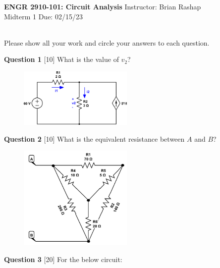 \documentclass[12pt]{article}
\begin{document}
\begin{center}
\hfil
{\large\bf {ENGR 2910-101: Circuit Analysis}}
\hfill Instructor: Brian Rashap\\
Midterm 1  \hfill Due: 02/15/23\\
\hrulefill\\
\end{center}

Please show all your work and circle your answers to each question.
\newline\newline

{\bf Question 1} [10]
\newline
What is the value of $v_2$?

\begin{figure}[h!]
\centering 
\includegraphics[clip,width=0.49\textwidth]{mid1_1.png}
\end{figure}

{\bf Question 2} [10] 
\newline
What is the equivalent resistance between $A$ and $B$?

\begin{figure}[h!]
  \centering 
 \vspace{-0.1in}
 \includegraphics[clip,width=0.49\textwidth]{mid1_2.jpg}
\vspace{-0.1in}
\end{figure}


\newpage
{\bf Question 3} [20] 
\newline
For the below circuit:
\end{document}
